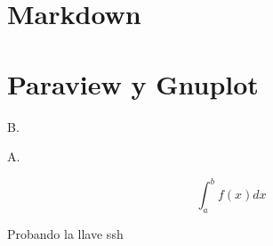 \documentclass[10pt,
	a4paper,
	spanish,
	titlepage=firstiscover,
	titlepage=true,
	BCOR=2cm,
	DIV=12
]{scrbook}
\begin{document}
\begin{refsection}
	\section{Markdown}
	
	\section{Paraview y Gnuplot}
	
	
	

	
	B.\cite{Reilly}

	\printbibliography[
	title={Referencias},
	heading=bibintoc]
	\nocite{*}
	\printbibliography[
	title={Bibliografía},
	heading=none,keyword=paper]
\end{refsection}

A.

$$\int_a^b f(x)dx$$

Probando la llave ssh

\printindex
\end{document}
